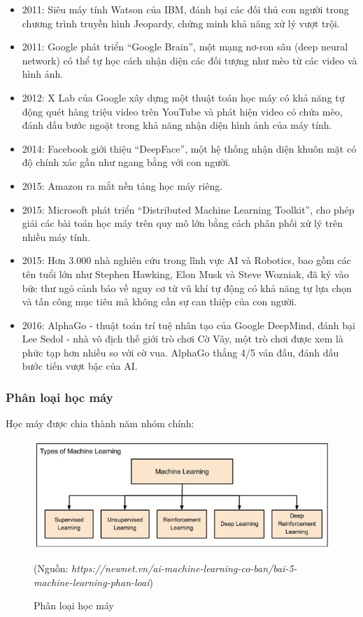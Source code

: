 \documentclass[13pt]{article}
\begin{document}
\begin{itemize}
        \item 2011: Siêu máy tính Watson của IBM, đánh bại các đối thủ con người trong chương trình truyền hình Jeopardy, chứng minh khả năng xử lý vượt trội.
        \item 2011: Google phát triển “Google Brain”, một mạng nơ-ron sâu (deep neural network) có thể tự học cách nhận diện các đối tượng như mèo từ các video và hình ảnh.
        \item 2012: X Lab của Google xây dựng một thuật toán học máy có khả năng tự động quét hàng triệu video trên YouTube và phát hiện video có chứa mèo, đánh dấu bước ngoặt trong khả năng nhận diện hình ảnh của máy tính.
        \item 2014: Facebook giới thiệu “DeepFace”, một hệ thống nhận diện khuôn mặt có độ chính xác gần như ngang bằng với con người.
        \item 2015: Amazon ra mắt nền tảng học máy riêng.
        \item 2015: Microsoft phát triển “Distributed Machine Learning Toolkit”, cho phép giải các bài toán học máy trên quy mô lớn bằng cách phân phối xử lý trên nhiều máy tính.
        \item 2015: Hơn 3.000 nhà nghiên cứu trong lĩnh vực AI và Robotics, bao gồm các tên tuổi lớn như Stephen Hawking, Elon Musk và Steve Wozniak, đã ký vào bức thư ngỏ cảnh báo về nguy cơ từ vũ khí tự động có khả năng tự lựa chọn và tấn công mục tiêu mà không cần sự can thiệp của con người.
        \item 2016: AlphaGo - thuật toán trí tuệ nhân tạo của Google DeepMind, đánh bại Lee Sedol - nhà vô địch thế giới trò chơi Cờ Vây, một trò chơi được xem là phức tạp hơn nhiều so với cờ vua. AlphaGo thắng 4/5 ván đấu, đánh dấu bước tiến vượt bậc của AI.
    \end{itemize}

\subsubsection{Phân loại học máy}
Học máy được chia thành năm nhóm chính:

    \begin{figure}[h!]
        \centering        \includegraphics[width=0.7\linewidth]{image/h4.jpg}
            \caption{Phân loại học máy}
            \label{fig:label1}
            (Nguồn: \textit{https://newnet.vn/ai-machine-learning-co-ban/bai-5-machine-learning-phan-loai})
    \end{figure}
\end{document}
